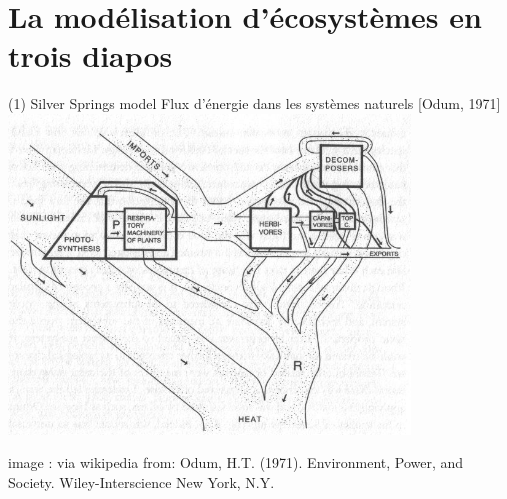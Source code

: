 \documentclass[11,aspectratio=1610]{beamer}
\begin{document}
\section{La modélisation d'écosystèmes en trois diapos}




\begin{frame}{(1) Silver Springs model  }
Flux d'énergie dans les systèmes naturels  [Odum,  1971]
\includegraphics[width=0.8\textwidth]{img/Silver_Spring_Model.jpeg} 

\tiny{image  : via wikipedia from:  Odum, H.T. (1971). Environment, Power, and Society. Wiley-Interscience New York, N.Y.}
\end{frame}
\end{document}
